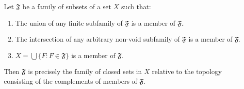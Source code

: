 Let $\mathfrak{F}$ be a family of subsets of a set $X$ such that:
\begin{enumerate}
\item The union of any finite subfamily of $\mathfrak{F}$ is a member of $\mathfrak{F}$.
\item The intersection of any arbitrary non-void subfamily of $\mathfrak{F}$ is a member of $\mathfrak{F}$.
\item $X = \bigcup \{F : F \in \mathfrak{F}\}$ is a member of $\mathfrak{F}$.
\end{enumerate}
Then $\mathfrak{F}$ is precisely the family of closed sets in $X$ relative to the topology consisting of the complements of members of $\mathfrak{F}$.
